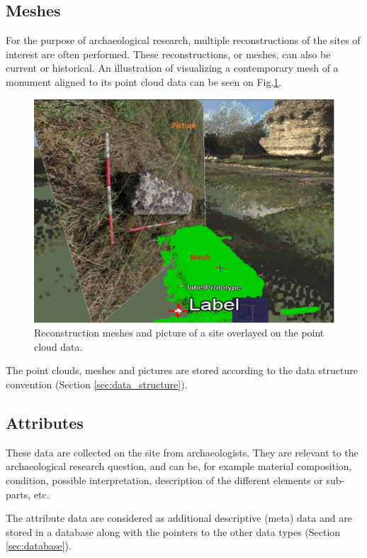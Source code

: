\subsection{Meshes}
For the purpose of archaeological research, multiple reconstructions of the sites of interest are often performed. These reconstructions, or meshes, can also be current or historical. An illustration of visualizing a contemporary mesh of a monument aligned to its point cloud data can be seen on Fig.\ref{fig:viaAppiaMeshPicture}.

\begin{figure}[!ht]
\centering
\includegraphics[scale=0.5]{fig/conceptual_description/ViaAppiaMeshPicture.pdf}
\caption{Reconstruction meshes and picture of a site overlayed on the point cloud data.}
\label{fig:viaAppiaMeshPicture}
\end{figure}


The point clouds, meshes and pictures are stored according to the data structure convention (Section \ref{sec:data_structure}).

\subsection {Attributes}
These data are collected on the site from archaeologists. They are relevant to the archaeological research question,  and can be, for example material composition, condition, possible interpretation, description of the different elements or sub-parts, etc.  

The attribute data are considered as additional descriptive (meta) data and are stored in a database along with the pointers to the other data types (Section \ref{sec:database}).